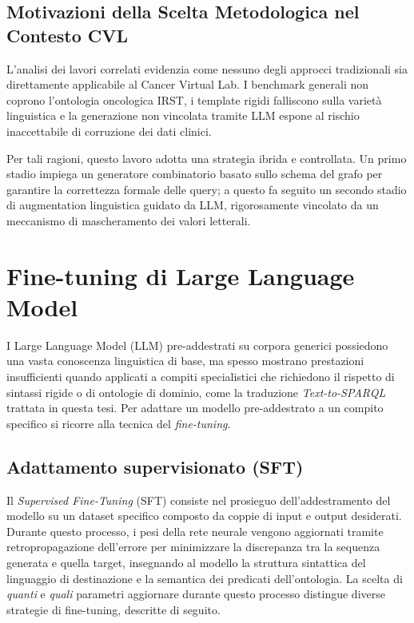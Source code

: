 \documentclass[12pt,a4paper,openright,twoside]{book}
\begin{document}
\subsection{Motivazioni della Scelta Metodologica nel Contesto CVL}
L'analisi dei lavori correlati evidenzia come nessuno degli approcci
tradizionali sia direttamente applicabile al Cancer Virtual Lab. I benchmark
generali non coprono l'ontologia oncologica IRST, i template rigidi falliscono
sulla varietà linguistica e la generazione non vincolata tramite LLM espone al
rischio inaccettabile di corruzione dei dati clinici.

Per tali ragioni, questo lavoro adotta una strategia ibrida e controllata. Un
primo stadio impiega un generatore combinatorio basato sullo schema del grafo
per garantire la correttezza formale delle query; a questo fa seguito un secondo
stadio di augmentation linguistica guidato da LLM, rigorosamente vincolato da un
meccanismo di mascheramento dei valori letterali.

\section{Fine-tuning di Large Language Model}
\label{sec:bg-finetuning}

I Large Language Model (LLM) pre-addestrati su corpora generici possiedono una
vasta conoscenza linguistica di base, ma spesso mostrano prestazioni
insufficienti quando applicati a compiti specialistici che richiedono il
rispetto di sintassi rigide o di ontologie di dominio, come la traduzione
\textit{Text-to-SPARQL} trattata in questa tesi. Per adattare un modello
pre-addestrato a un compito specifico si ricorre alla tecnica del
\textit{fine-tuning}.

\subsection{Adattamento supervisionato (SFT)}
Il \textit{Supervised Fine-Tuning} (SFT) consiste nel prosieguo
dell'addestramento del modello su un dataset specifico composto da coppie di
input e output desiderati. Durante questo processo, i pesi della rete neurale
vengono aggiornati tramite retropropagazione dell'errore per minimizzare la
discrepanza tra la sequenza generata e quella target, insegnando al modello la
struttura sintattica del linguaggio di destinazione e la semantica dei predicati
dell'ontologia. La scelta di \emph{quanti} e \emph{quali} parametri aggiornare
durante questo processo distingue diverse strategie di fine-tuning, descritte di
seguito.
\end{document}
